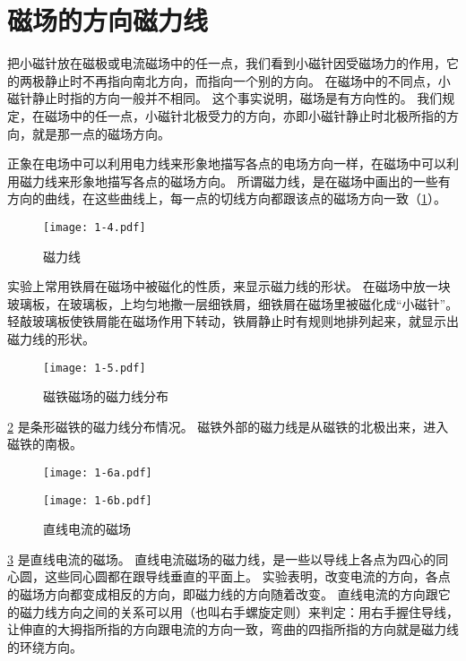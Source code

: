 \section{磁场的方向\texorpdfstring{\quad}{ }磁力线}
把小磁针放在磁极或电流磁场中的任一点，我们看到小磁针因受磁场力的作用，它的两极静止时不再指向南北方向，而指向一个别的方向。
在磁场中的不同点，小磁针静止时指的方向一般并不相同。
这个事实说明，磁场是有方向性的。
我们规定，在磁场中的任一点，小磁针北极受力的方向，亦即小磁针静止时北极所指的方向，就是那一点的磁场方向。

正象在电场中可以利用电力线来形象地描写各点的电场方向一样，在磁场中可以利用磁力线来形象地描写各点的磁场方向。
所谓磁力线，是在磁场中画出的一些有方向的曲线，在这些曲线上，每一点的切线方向都跟该点的磁场方向一致（\cref{fig:1-4}）。
\begin{figure}
  \texttt{[image: 1-4.pdf]}
  \caption{磁力线}\label{fig:1-4}
\end{figure}

实验上常用铁屑在磁场中被磁化的性质，来显示磁力线的形状。
在磁场中放一块玻璃板，在玻璃板，上均匀地撒一层细铁屑，细铁屑在磁场里被磁化成“小磁针”。
轻敲玻璃板使铁屑能在磁场作用下转动，铁屑静止时有规则地排列起来，就显示出磁力线的形状。

\begin{figure}
  \texttt{[image: 1-5.pdf]}
  \caption{磁铁磁场的磁力线分布}\label{fig:1-5}
\end{figure}

\cref{fig:1-5} 是条形磁铁的磁力线分布情况。
磁铁外部的磁力线是从磁铁的北极出来，进入磁铁的南极。

\begin{figure}
  \begin{minipage}[b]{0.48\linewidth}\centering
    \texttt{[image: 1-6a.pdf]}
    \label{fig:1-6a}
  \end{minipage}
  \begin{minipage}[b]{0.48\linewidth}\centering
    \texttt{[image: 1-6b.pdf]}
    \label{fig:1-6b}
  \end{minipage}
  \caption{直线电流的磁场}\label{fig:1-6}
\end{figure}

\cref{fig:1-6} 是直线电流的磁场。
直线电流磁场的磁力线，是一些以导线上各点为四心的同心圆，这些同心圆都在跟导线垂直的平面上。
实验表明，改变电流的方向，各点的磁场方向都变成相反的方向，即磁力线的方向随着改变。
直线电流的方向跟它的磁力线方向之间的关系可以用（也叫右手螺旋定则）来判定：用右手握住导线，让伸直的大拇指所指的方向跟电流的方向一致，弯曲的四指所指的方向就是磁力线的环绕方向。


